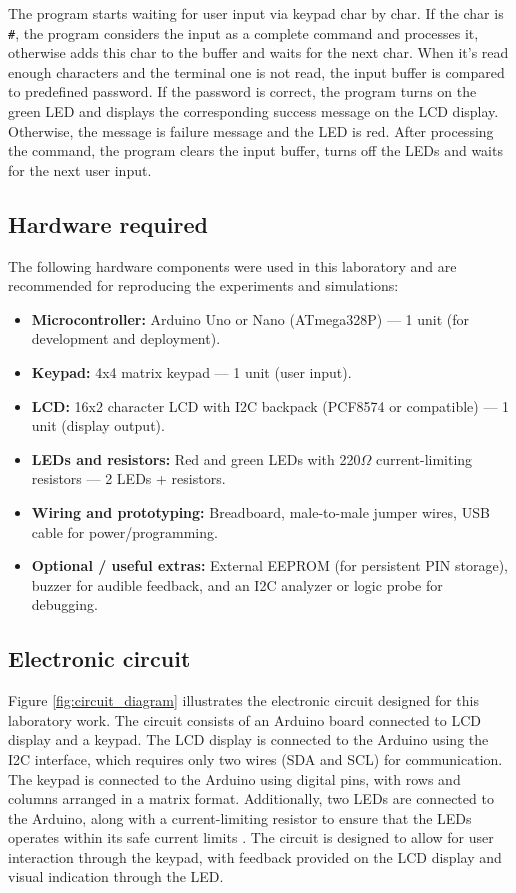 The program starts waiting for user input via keypad char by char. If the char is \texttt{\#}, the program considers the input as a complete command and processes it, otherwise adds this char to the buffer and waits for the next char. When it's read enough characters and the terminal one is not read, the input buffer is compared to predefined password. If the password is correct, the program turns on the green LED and displays the corresponding success message on the LCD display. Otherwise, the message is failure message and the LED is red. After processing the command, the program clears the input buffer, turns off the LEDs and waits for the next user input.


\subsection{Hardware required}

The following hardware components were used in this laboratory and are recommended for reproducing the experiments and simulations:

\begin{itemize}
    \item \textbf{Microcontroller:} Arduino Uno or Nano (ATmega328P) — 1 unit (for development and deployment).
    \item \textbf{Keypad:} 4x4 matrix keypad — 1 unit (user input).
    \item \textbf{LCD:} 16x2 character LCD with I2C backpack (PCF8574 or compatible) — 1 unit (display output).
    \item \textbf{LEDs and resistors:} Red and green LEDs with 220$\Omega$ current-limiting resistors — 2 LEDs + resistors.
    \item \textbf{Wiring and prototyping:} Breadboard, male-to-male jumper wires, USB cable for power/programming.
    \item \textbf{Optional / useful extras:} External EEPROM (for persistent PIN storage), buzzer for audible feedback, and an I2C analyzer or logic probe for debugging.
\end{itemize}


\subsection{Electronic circuit}

Figure \ref{fig:circuit_diagram} illustrates the electronic circuit designed for this laboratory work. The circuit consists of an Arduino board connected to LCD display and a keypad. The LCD display is connected to the Arduino using the I2C interface, which requires only two wires (SDA and SCL) for communication. The keypad is connected to the Arduino using digital pins, with rows and columns arranged in a matrix format. Additionally, two LEDs are connected to the Arduino, along with a current-limiting resistor to ensure that the LEDs operates within its safe current limits \cite{led-limit}. The circuit is designed to allow for user interaction through the keypad, with feedback provided on the LCD display and visual indication through the LED.


